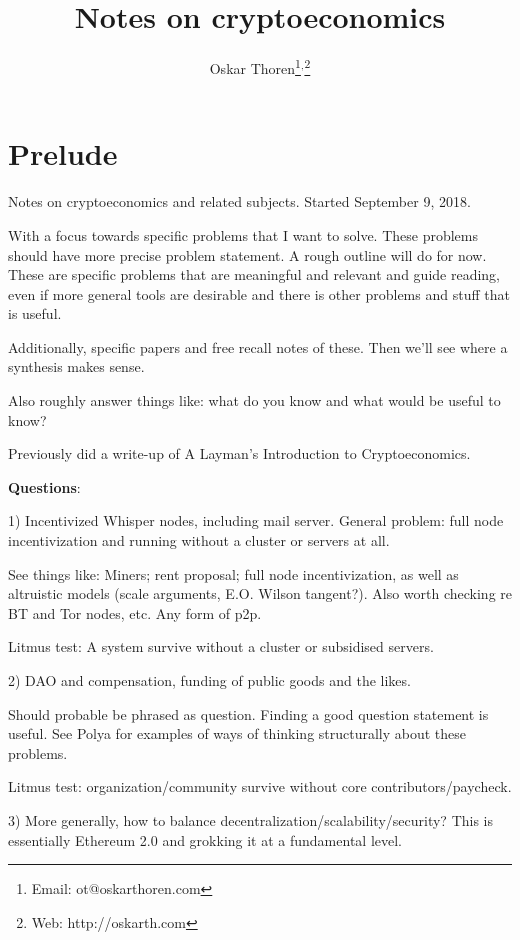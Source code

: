 \documentclass[12pt]{report}
\begin{document}
\title{Notes on cryptoeconomics}
\author{Oskar Thoren\thanks{Email: ot@oskarthoren.com}$^{,}$\thanks{Web: http://oskarth.com}}

\maketitle

\chapter{Prelude}

Notes on cryptoeconomics and related subjects. Started September 9, 2018.

With a focus towards specific problems that I want to solve. These problems
should have more precise problem statement. A rough outline will do for now.
These are specific problems that are meaningful and relevant and guide reading,
even if more general tools are desirable and there is other problems and stuff
that is useful.

Additionally, specific papers and free recall notes of these. Then we'll see
where a synthesis makes sense.

Also roughly answer things like: what do you know and what would be useful to
know?

Previously did a write-up of A Layman's Introduction to Cryptoeconomics.

\textbf{Questions}:

1) Incentivized Whisper nodes, including mail server. General problem: full node
incentivization and running without a cluster or servers at all.

See things like: Miners; rent proposal; full node incentivization, as well as
altruistic models (scale arguments, E.O. Wilson tangent?). Also worth checking
re BT and Tor nodes, etc. Any form of p2p.

Litmus test: A system survive without a cluster or subsidised servers.

2) DAO and compensation, funding of public goods and the likes.

Should probable be phrased as question. Finding a good question statement is
useful. See Polya for examples of ways of thinking structurally about these
problems.

Litmus test: organization/community survive without core contributors/paycheck.

3) More generally, how to balance decentralization/scalability/security? This is
essentially Ethereum 2.0 and grokking it at a fundamental level.
\end{document}
